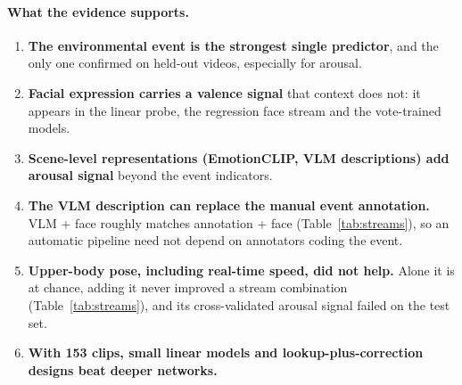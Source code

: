 \documentclass[11pt]{article}
\begin{document}
\paragraph{What the evidence supports.}
\begin{enumerate}
  \item \textbf{The environmental event is the strongest single predictor}, and the only one confirmed on held-out videos, especially for arousal.
  \item \textbf{Facial expression carries a valence signal} that context does not: it appears in the linear probe, the regression face stream and the vote-trained models.
  \item \textbf{Scene-level representations (EmotionCLIP, VLM descriptions) add arousal signal} beyond the event indicators.
  \item \textbf{The VLM description can replace the manual event annotation.} VLM + face roughly matches annotation + face (Table~\ref{tab:streams}), so an automatic pipeline need not depend on annotators coding the event.
  \item \textbf{Upper-body pose, including real-time speed, did not help.} Alone it is at chance, adding it never improved a stream combination (Table~\ref{tab:streams}), and its cross-validated arousal signal failed on the test set.
  \item \textbf{With 153 clips, small linear models and lookup-plus-correction designs beat deeper networks.}
\end{enumerate}
\end{document}
